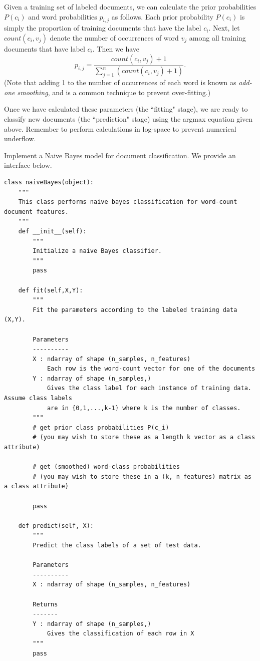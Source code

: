 Given a training set of labeled documents, we can calculate the prior probabilities $P(c_i)$ and word probabilities
$p_{i,j}$ as follows.
Each prior probability $P(c_i)$ is simply the proportion of training documents that have the label $c_i$.
Next, let $count(c_i,v_j)$ denote the number of occurrences of word $v_j$ among all training documents that have label $c_i$.
Then we have
\[
p_{i,j}  = \frac{count(c_i,v_j)+1}{\sum_{j=1}^n(count(c_i,v_j)+1)}.
\]
(Note that adding 1 to the number of occurrences of each word is known as \emph{add-one smoothing}, and is a
common technique to prevent over-fitting.)

Once we have calculated these parameters (the ``fitting" stage), we are ready to classify new documents
(the ``prediction" stage) using the argmax equation given above.
Remember to perform calculations in log-space to prevent numerical underflow.

\begin{problem}
Implement a Naive Bayes model for document classification.
We provide an interface below.

\begin{lstlisting}
class naiveBayes(object):
    """
    This class performs naive bayes classification for word-count document features.
    """
    def __init__(self):
        """
        Initialize a naive Bayes classifier.
        """
        pass

    def fit(self,X,Y):
        """
        Fit the parameters according to the labeled training data (X,Y).

        Parameters
        ----------
        X : ndarray of shape (n_samples, n_features)
            Each row is the word-count vector for one of the documents
        Y : ndarray of shape (n_samples,)
            Gives the class label for each instance of training data. Assume class labels
            are in {0,1,...,k-1} where k is the number of classes.
        """
        # get prior class probabilities P(c_i)
        # (you may wish to store these as a length k vector as a class attribute)

        # get (smoothed) word-class probabilities
        # (you may wish to store these in a (k, n_features) matrix as a class attribute)

        pass

    def predict(self, X):
        """
        Predict the class labels of a set of test data.

        Parameters
        ----------
        X : ndarray of shape (n_samples, n_features)

        Returns
        -------
        Y : ndarray of shape (n_samples,)
            Gives the classification of each row in X
        """
        pass
\end{lstlisting}
\end{problem}

